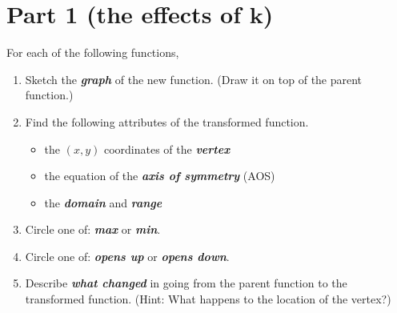 \section*{Part 1 (the effects of $\bm{k}$)}

{
\small
For each of the following functions,
\begin{enumerate}[nosep]
    \item Sketch the {\bfseries\itshape graph} of the new function. (Draw it on top of the parent function.)
    \item Find the following attributes of the transformed function.
    \begin{itemize}[nosep]
        \item the $(x,y)$ coordinates of the {\bfseries\itshape vertex}
        \item the equation of the {\bfseries\itshape axis of symmetry} (AOS)
        \item the {\bfseries\itshape domain} and {\bfseries\itshape range}
    \end{itemize}
    \item Circle one of: {\bfseries\itshape max} or {\bfseries\itshape min}.
    \item Circle one of: {\bfseries\itshape opens up} or {\bfseries\itshape opens down}.
    \item Describe {\bfseries\itshape what changed} in going from the parent function to the transformed function.
        (Hint: What happens to the location of the vertex?)
\end{enumerate}
}
\vspace{\baselineskip}

\begin{tcbposter}[
        poster = {
            rows=7,
            columns=2,
            height=10cm,
            spacing=1mm,
            },
        boxes = {colbacktitle=black!15,coltitle=black,colback=white,sharp corners}
    ]
\end{tcbposter}




